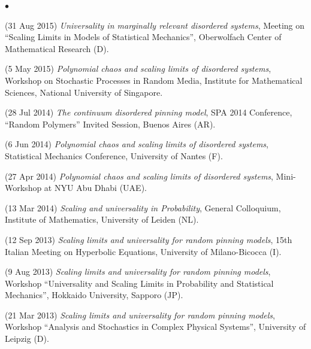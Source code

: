 \documentclass[a4paper,11pt,oneside]{amsart}
\newenvironment{myitemize}{%
\begin{list}{$\bullet$}%
 	{%
	\setlength{\itemsep}{0.3em}%
	\setlength{\topsep}{0.3em}%
	\setlength{\partopsep}{0em}%
	\setlength{\parsep}{0em}%
	\setlength{\parskip}{0em}%
	\setlength\leftmargin{1.5em}%
	\setlength\labelwidth{1.1em}%
	\setlength{\labelsep}{0.4em}%
	}%
	}%
{\end{list}}
\renewenvironment{itemize}{
\begin{myitemize}}%
{\end{myitemize}}
\begin{document}
\begin{itemize}
\item (31 Aug 2015)
\emph{Universality in marginally relevant disordered systems},
Meeting on ``Scaling Limits in Models of Statistical Mechanics'',
Oberwolfach Center of Mathematical Research (D).

\item (5 May 2015)
\emph{Polynomial chaos and scaling limits of disordered systems},
Workshop on Stochastic Processes in Random Media,  Institute for Mathematical Sciences,
National University of Singapore.

\item (28 Jul 2014)
\emph{The continuum disordered pinning model},
SPA 2014 Conference, ``Random Polymers'' Invited Session, Buenos Aires (AR).

\item (6 Jun 2014)
\emph{Polynomial chaos and scaling limits of disordered systems},
Statistical Mechanics Conference, University of Nantes (F).

\item (27 Apr 2014)
\emph{Polynomial chaos and scaling limits of disordered systems},
Mini-Workshop at NYU Abu Dhabi (UAE).

\item (13 Mar 2014)
\emph{Scaling and universality in Probability},
General Colloquium, Institute of Mathematics,
University of Leiden (NL).

\item (12 Sep 2013)
\emph{Scaling limits and universality for random pinning models},
15th Italian Meeting on Hyperbolic Equations,
University of Milano-Bicocca (I).

\item (9 Aug 2013)
\emph{Scaling limits and universality for random pinning models},
Workshop ``Universality and Scaling Limits in Probability and Statistical Mechanics'',
Hokkaido University, Sapporo (JP).

\item (21 Mar 2013)
\emph{Scaling limits and universality for random pinning models},
Workshop ``Analysis and Stochastics in Complex Physical Systems'', University of Leipzig (D).

%
%


\end{itemize}
\end{document}
